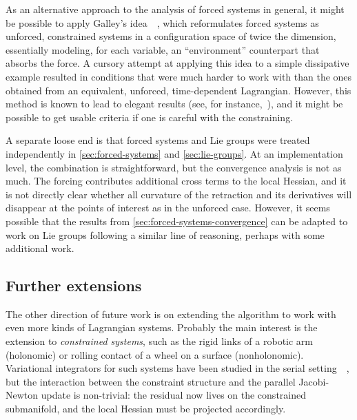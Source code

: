 As an alternative approach to the analysis of forced systems in general, it might be possible to apply Galley's idea~\cite{galleyClassicalMechanicsNonconservative2013}~\cite[\S\S4.2.1,~4.3.3]{satomartindealmagroDiscreteMechanicsForced2020}, which reformulates forced systems as unforced, constrained systems in a configuration space of twice the dimension, essentially modeling, for each variable, an ``environment'' counterpart that absorbs the force. A cursory attempt at applying this idea to a simple dissipative example resulted in conditions that were much harder to work with than the ones obtained from an equivalent, unforced, time-dependent Lagrangian. However, this method is known to lead to elegant results (see, for instance,~\cite{diegoVariationalOrderForced2018}), and it might be possible to get usable criteria if one is careful with the constraining.

A separate loose end is that forced systems and Lie groups were treated independently in \cref{sec:forced-systems} and \cref{sec:lie-groups}. At an implementation level, the combination is straightforward, but the convergence analysis is not as much. The forcing contributes additional cross terms to the local Hessian, and it is not directly clear whether all curvature of the retraction and its derivatives will disappear at the points of interest as in the unforced case. However, it seems possible that the results from \cref{sec:forced-systems-convergence} can be adapted to work on Lie groups following a similar line of reasoning, perhaps with some additional work. 

\subsection*{Further extensions}

The other direction of future work is on extending the algorithm to work with even more kinds of Lagrangian systems. Probably the main interest is the extension to \emph{constrained systems}, such as the rigid links of a robotic arm (holonomic) or rolling contact of a wheel on a surface (nonholonomic). Variational integrators for such systems have been studied in the serial setting~\cite[\S\S3.4--3.5]{marsdenDiscreteMechanicsVariational2001}~\cite[\S5.4]{satomartindealmagroDiscreteMechanicsForced2020}, but the interaction between the constraint structure and the parallel Jacobi-Newton update is non-trivial: the residual now lives on the constrained submanifold, and the local Hessian must be projected accordingly.


